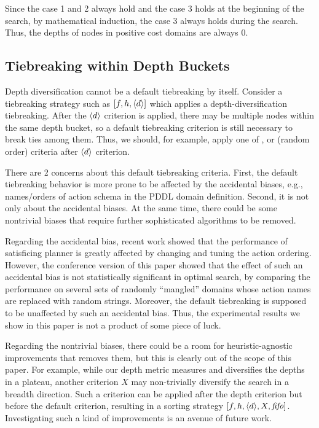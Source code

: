 Since the case 1 and 2 always hold and the case 3 holds at the beginning of the search,
by mathematical induction, the case 3 always holds during the search.
Thus, the depths of nodes in positive cost domains are always 0.

\subsection{Tiebreaking within Depth Buckets}

Depth diversification cannot be a default tiebreaking by itself.
Consider a tiebreaking strategy such as $[f,h,{\left<d\right>}]$ which applies a depth-diversification tiebreaking.
After the ${\left<d\right>}$ criterion is applied, 
there may be multiple nodes within the same depth bucket, so a
default tiebreaking criterion is still necessary to break ties among them.
Thus, we should, for example, apply one of \lifo, \fifo or \ro (random order) criteria
after ${\left<d\right>}$ criterion.

There are 2 concerns about this default tiebreaking criteria.
First, the default tiebreaking behavior is more prone to be
affected by the accidental biases, e.g., names/orders of action schema in the PDDL domain definition.
Second, it is not only about the accidental biases.
At the same time, there could be some nontrivial biases that require further
sophisticated algorithms to be removed.

Regarding the accidental bias, recent work \cite{vallati2015effective} showed that the performance of satisficing
planner is greatly affected by changing and tuning the action ordering.
However, the conference version of this paper \cite{Asai2016} showed that
the effect of such an accidental bias is not statistically significant in optimal search,
by comparing the performance on
several sets of randomly ``mangled'' domains whose action names are replaced with random strings.
Moreover, the \ro default tiebreaking is supposed to be unaffected by such an accidental bias.
Thus, the experimental results we show in this paper is not a product of some piece of luck.

Regarding the nontrivial biases, there could be a room for heuristic-agnostic improvements that removes them, but
this is clearly out of the scope of this paper.   For example, while our depth
metric measures and diversifies the depths in a plateau, another criterion $X$ may non-trivially diversify the
search in a breadth direction.  Such a criterion can be applied after the depth criterion but before the default criterion,
resulting in a sorting strategy $[f,h,{\left<d\right>},X,{\text{\textit{fifo}}}]$. Investigating such a kind of improvements is an avenue of
future work.

